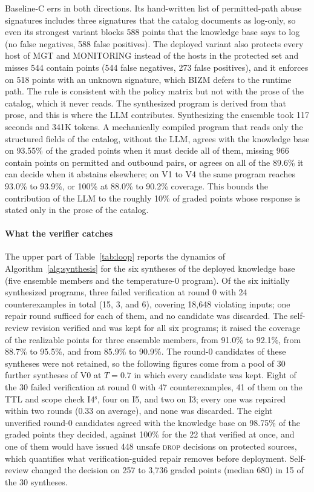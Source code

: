\documentclass[final,5p]{elsarticle}
\begin{document}
Baseline-C errs in both directions. Its hand-written list of permitted-path abuse signatures includes three signatures that the catalog documents as log-only, so even its strongest variant blocks 588 points that the knowledge base says to log (no false negatives, 588 false positives). The deployed variant also protects every host of MGT and MONITORING instead of the hosts in the protected set and misses 544 contain points (544 false negatives, 273 false positives), and it enforces on 518 points with an unknown signature, which BIZM defers to the runtime path. The rule is consistent with the policy matrix but not with the prose of the catalog, which it never reads. The synthesized program is derived from that prose, and this is where the LLM contributes. Synthesizing the ensemble took 117 seconds and 341K tokens. A mechanically compiled program that reads only the structured fields of the catalog, without the LLM, agrees with the knowledge base on 93.55\% of the graded points when it must decide all of them, missing 966 contain points on permitted and outbound pairs, or agrees on all of the 89.6\% it can decide when it abstains elsewhere; on V1 to V4 the same program reaches 93.0\% to 93.9\%, or 100\% at 88.0\% to 90.2\% coverage. This bounds the contribution of the LLM to the roughly 10\% of graded points whose response is stated only in the prose of the catalog.

\paragraph{What the verifier catches}
The upper part of Table~\ref{tab:loop} reports the dynamics of Algorithm~\ref{alg:synthesis} for the six syntheses of the deployed knowledge base (five ensemble members and the temperature-0 program). Of the six initially synthesized programs, three failed verification at round 0 with 24 counterexamples in total (15, 3, and 6), covering 18,648 violating inputs; one repair round sufficed for each of them, and no candidate was discarded. The self-review revision verified and was kept for all six programs; it raised the coverage of the realizable points for three ensemble members, from 91.0\% to 92.1\%, from 88.7\% to 95.5\%, and from 85.9\% to 90.9\%. The round-0 candidates of these syntheses were not retained, so the following figures come from a pool of 30 further syntheses of V0 at $T=0.7$ in which every candidate was kept. Eight of the 30 failed verification at round 0 with 47 counterexamples, 41 of them on the TTL and scope check I4$^{\mathrm{s}}$, four on I5, and two on I3; every one was repaired within two rounds (0.33 on average), and none was discarded. The eight unverified round-0 candidates agreed with the knowledge base on 98.75\% of the graded points they decided, against 100\% for the 22 that verified at once, and one of them would have issued 448 unsafe \textsc{drop} decisions on protected sources, which quantifies what verification-guided repair removes before deployment. Self-review changed the decision on 257 to 3,736 graded points (median 680) in 15 of the 30 syntheses.
\end{document}
